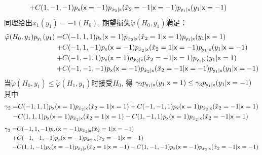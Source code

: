 \documentclass[a4paper]{article}
\begin{document}
\begin{enumerate}[label=\thehwcnt.\arabic*.]
\begin{enumerate}[label=(\alph*)]
\begin{align*}
    +&C(1,-1,-1)p_{\mathsf{x}}(\mathsf{x}=-1)p_{\hat{x}_2|\mathsf{x}}(\hat{x}_2=-1|\mathsf{x}=-1)p_{\mathsf{y}_1|\mathsf{x}}(y_1|\mathsf{x}=-1)
    \end{align*}
    同理给出$\hat{x}_1(y_1)=-1(H_0)$, 期望损失$\tilde{\varphi}(H_0,y_1)$满足：
    \begin{align*}
    \tilde{\varphi}(H_0,y_1)p_{\mathsf{y}_1}(y_1)=& C(-1,1,1)p_{\mathsf{x}}(\mathsf{x}=1)p_{\hat{x}_2|\mathsf{x}}(\hat{x}_2=1|\mathsf{x}=1)p_{\mathsf{y}_1|\mathsf{x}}(y_1|\mathsf{x}=1)\\
    +&C(-1,1,-1)p_{\mathsf{x}}(\mathsf{x}=-1)p_{\hat{x}_2|\mathsf{x}}(\hat{x}_2=1|\mathsf{x}=-1)p_{\mathsf{y}_1|\mathsf{x}}(y_1|\mathsf{x}=-1)\\
    +&C(-1,-1,1)p_{\mathsf{x}}(\mathsf{x}=1)p_{\hat{x}_2|\mathsf{x}}(\hat{x}_2=-1|\mathsf{x}=1)p_{\mathsf{y}_1|\mathsf{x}}(y_1|\mathsf{x}=1)\\
    +&C(-1,-1,-1)p_{\mathsf{x}}(\mathsf{x}=-1)p_{\hat{x}_2|\mathsf{x}}(\hat{x}_2=-1|\mathsf{x}=-1)p_{\mathsf{y}_1|\mathsf{x}}(y_1|\mathsf{x}=-1)
    \end{align*}
    当$\tilde{\varphi}(H_0,y_1)\leq \tilde{\varphi}(H_1,y_1)$时接受$H_0$,
    得 $\gamma_2 p_{\mathsf{y}_1|\mathsf{x}}(y_1|\mathsf{x}=1) \leq \gamma_3 p_{\mathsf{y}_1|\mathsf{x}}(y_1| \mathsf{x}=-1)$
    其中
    \begin{align*}
    \gamma_2=& C(-1,1,1)p_{\mathsf{x}}(\mathsf{x}=1)p_{\hat{x}_2|\mathsf{x}}(\hat{x}_2=1|\mathsf{x}=1)
    +C(-1,-1,1)p_{\mathsf{x}}(\mathsf{x}=1)p_{\hat{x}_2|\mathsf{x}}(\hat{x}_2=-1|\mathsf{x}=1)\\
    -&C(1,1,1)p_{\mathsf{x}}(\mathsf{x}=1)p_{\hat{x}_2|\mathsf{x}}(\hat{x}_2=1|\mathsf{x}=1)
    -C(1,-1,1)p_{\mathsf{x}}(\mathsf{x}=1)p_{\hat{x}_2|\mathsf{x}}(\hat{x}_2=-1|\mathsf{x}=1)
    \end{align*}
    \begin{align*}
    \gamma_3=& C(-1,1,-1)p_{\mathsf{x}}(\mathsf{x}=-1)p_{\hat{x}_2|\mathsf{x}}(\hat{x}_2=1|\mathsf{x}=-1)\\
    +&C(-1,-1,-1)p_{\mathsf{x}}(\mathsf{x}=-1)p_{\hat{x}_2|\mathsf{x}}(\hat{x}_2=-1|\mathsf{x}=-1)\\
    -&C(1,1,-1)p_{\mathsf{x}}(\mathsf{x}=-1)p_{\hat{x}_2|\mathsf{x}}(\hat{x}_2=1|\mathsf{x}=-1)
    -C(1,-1,-1)p_{\mathsf{x}}(\mathsf{x}=-1)p_{\hat{x}_2|\mathsf{x}}(\hat{x}_2=-1|\mathsf{x}=-1)
    \end{align*}
    

\end{enumerate}
\end{enumerate}
\end{document}
